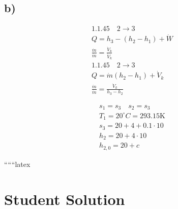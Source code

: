 

\subsection*{b)}

\begin{align*}
    1.1.45 \quad 2 \rightarrow 3 \\
    Q = h_3 - (h_2 - h_1) + \dot{W} \\
    \frac{\dot{m}}{\dot{m}} = \frac{\dot{V}_k}{\dot{V}_k} \\
    1.1.45 \quad 2 \rightarrow 3 \\
    Q = \dot{m} (h_2 - h_1) + \dot{V}_k \\
    \frac{\dot{m}}{\dot{m}} = \frac{\dot{V}_k}{h_3 - h_2}
\end{align*}

\begin{align*}
    s_1 = s_3 \quad s_2 = s_3 \\
    T_1 = 20^\circ C = 293.15 \text{K} \\
    s_3 = 20 + 4 + 0.1 \cdot 10 \\
    h_2 = 20 + 4 \cdot 10 \\
    h_{2,0} = 20 + c
\end{align*}

``````latex


\section*{Student Solution}